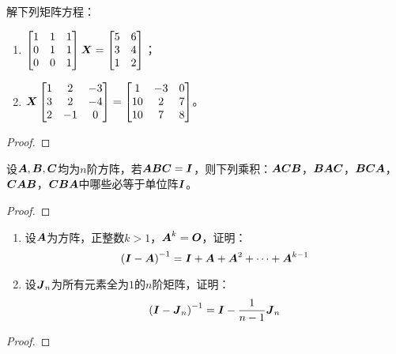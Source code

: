 \begin{problem}\label{problem-2.40}
解下列矩阵方程：
\begin{enumerate}
    \item \(\begin{bmatrix}1&1&1\\0&1&1\\0&0&1\end{bmatrix}\boldsymbol{X}=\begin{bmatrix}5&6\\3&4\\1&2\end{bmatrix}\)；
    \item \(\boldsymbol{X}\begin{bmatrix}
              1 & 2  & -3 \\
              3 & 2  & -4 \\
              2 & -1 & 0
          \end{bmatrix}=\begin{bmatrix}
              1  & -3 & 0 \\
              10 & 2  & 7 \\
              10 & 7  & 8
          \end{bmatrix}\)。
\end{enumerate}
\end{problem}
\begin{proof}

\end{proof}

\begin{problem}\label{problem-2.41}
设\(\boldsymbol{A},\boldsymbol{B},\boldsymbol{C}\)均为\(n\)阶方阵，若\(\boldsymbol{A}\boldsymbol{B}\boldsymbol{C}=\boldsymbol{I}\)，则下列乘积：\(\boldsymbol{A}\boldsymbol{C}\boldsymbol{B}\)，\(\boldsymbol{B}\boldsymbol{A}\boldsymbol{C}\)，\(\boldsymbol{B}\boldsymbol{C}\boldsymbol{A}\)，\(\boldsymbol{C}\boldsymbol{A}\boldsymbol{B}\)，\(\boldsymbol{C}\boldsymbol{B}\boldsymbol{A}\)中哪些必等于单位阵\(\boldsymbol{I}\)。
\end{problem}
\begin{proof}
\end{proof}

\begin{problem}\label{problem-2.42}
\begin{enumerate}
    \item 设\(\boldsymbol{A}\)为方阵，正整数\(k>1\)，\(\boldsymbol{A}^k=\boldsymbol{O}\)，证明：
          \begin{equation*}
              {\left( \boldsymbol{I}-\boldsymbol{A}\right)}^{-1}=\boldsymbol{I}+\boldsymbol{A}+\boldsymbol{A}^2+\cdots+\boldsymbol{A}^{k-1}
          \end{equation*}
    \item 设\(\boldsymbol{J}_n\)为所有元素全为\(1\)的\(n\)阶矩阵，证明：
          \begin{equation*}
              {\left( \boldsymbol{I}-\boldsymbol{J}_n \right)}^{-1}=\boldsymbol{I}-\frac{1}{n-1}\boldsymbol{J}_n
          \end{equation*}
\end{enumerate}
\end{problem}
\begin{proof}
\end{proof}

